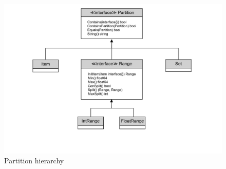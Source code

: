 \begin{figure}[H]
    \centering
    \includegraphics[width=\textwidth]{images/lib-partition.png}
    \caption{Partition hierarchy}\label{fig:partition_hierarchy}
\end{figure}

